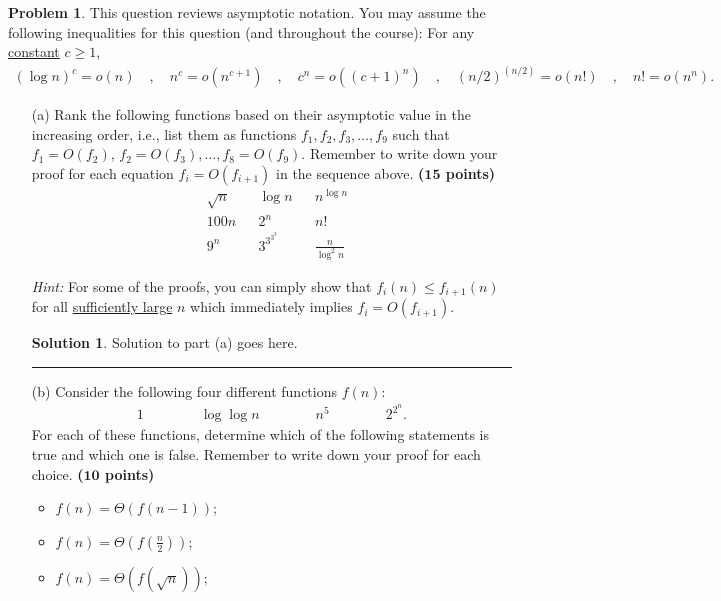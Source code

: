 \documentclass{article}
\theoremstyle{definition}
\newtheorem{problem}{Problem}
\def\fline{\rule{0.75\linewidth}{0.5pt}}
\newcommand{\finishline}{\begin{center}\fline\end{center}}
\newtheorem*{solution*}{Solution}
\newenvironment{solution}{\begin{solution*}}{{\finishline} \end{solution*}}
\newcommand{\grade}[1]{\hfill{\textbf{($\mathbf{#1}$ points)}}}
\begin{document}
\begin{problem}
	This question reviews asymptotic notation. You may assume the following inequalities for this question (and throughout the course): For any \underline{constant} $c \geq 1$, 
	\begin{align*}
		(\log{n})^c = o(n) \quad,\quad n^c = o(n^{c+1}) \quad,\quad c^n = o((c+1)^n) \quad,\quad (n/2)^{(n/2)} = o(n!) \quad,\quad n! = o(n^n). 
	\end{align*}
	\begin{enumerate}
	\item[(a)] Rank the following functions based on their asymptotic value in the increasing order, i.e., list them as functions $f_1,f_2,f_3,\ldots,f_{9}$ such that $f_1 = O(f_2)$, $f_2 = O(f_3), \ldots, f_{8} = O(f_{9})$. Remember to write down your proof
	for each equation $f_i = O(f_{i+1})$ in the sequence above.  \grade{15}
	\begin{align*}
		&\sqrt{{n}} &&\log{n} &&n^{{\log{n}}}  \\ 
		&100n   &&2^{n} &&n! \\ 
		&9^{n} && 3^{{3}^{{3}^{3}}} &&\frac{n}{\log^2{n}} 
	\end{align*}
	
	\smallskip 
	\emph{Hint:} For some of the proofs, you can simply show that $f_i(n) \leq f_{i+1}(n)$ for all \underline{sufficiently large} $n$ which immediately implies $f_i = O(f_{i+1})$. 
	

\begin{solution}
	Solution to part (a) goes here. %
\end{solution}
	
	\item[(b)]  Consider the following four different functions $f(n)$: 
	  \begin{align*}
	    1 \qquad\qquad  \log\log{n} \qquad\qquad  n^5  \qquad\qquad 2^{2^{n}}.
	  \end{align*} 
	 For each of these functions, determine which of the following statements is true and which one is false. Remember to write down your proof for each choice.    \grade{10} 
	\begin{itemize}
        \item $f(n) = \Theta(f(n-1))$;
        \item $f(n) = \Theta(f(\frac{n}{2}))$;
        \item $f(n) = \Theta(f(\sqrt n))$;
    \end{itemize}
    

\end{enumerate}
\end{problem}
\end{document}

